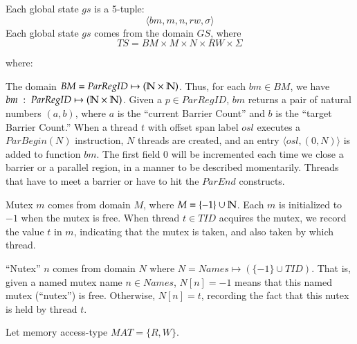 \noindent Each global state $gs$ is a 5-tuple:
\[ \langle bm, m, n, rw, \sigma \rangle \]
\noindent Each global state $gs$ comes from the domain $GS$, where
\[ TS = BM\times M\times N\times RW\times \Sigma \]

\noindent where:
%
\begin{compactitem}
\item The domain $BM = ParRegID \mapsto (\mathbb{N}\times \mathbb{N})$.  Thus, for each
  $bm\in BM$, we have $bm\; :\; ParRegID \mapsto (\mathbb{N}\times \mathbb{N})$.
  Given a $p\in ParRegID$, $bm$ returns a pair of natural numbers $(a,b)$,
  where $a$ is the ``current Barrier Count'' and $b$ is the ``target Barrier
  Count.''
  When a thread $t$ with offset span label $osl$ executes a $ParBegin(N)$
  instruction, $N$ threads are created, and an entry
  $\langle osl, (0,N)\rangle$ is added to function $bm$\footnotemark.
  The first field $0$ will be incremented each time we close a barrier or a
  parallel region, in a manner to be described momentarily.
  Threads that have to meet a barrier or have to hit the $ParEnd$ constructs.

\item Mutex $m$ comes from domain $M$, where $M=\{-1\}\cup \mathbb{N}$.  Each $m$ is
  initialized to $-1$ when the mutex is free.
  When thread $t\in TID$ acquires the mutex, we record the value $t$ in $m$,
  indicating that the mutex is taken, and also taken by which thread.

\item ``Nutex'' $n$ comes from domain $N$ where
  $N = Names \mapsto (\{-1\} \cup TID)$.
  That is, given a named mutex name $n \in Names$, $N[n] = -1$ means that this
  named mutex (``nutex'') is free.
  Otherwise, $N[n] = t$, recording the fact that this nutex is held by thread
  $t$.

\item Let memory access-type $MAT=\{R,W\}$.


\end{compactitem}
